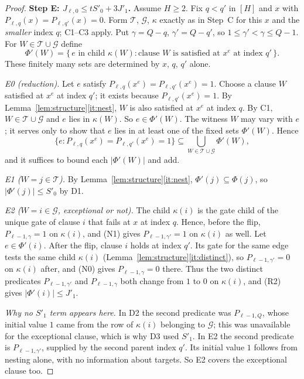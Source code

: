\documentclass[11pt]{article}
\theoremstyle{definition}
\theoremstyle{remark}
\begin{document}
\begin{proof}
\medskip\noindent\textbf{Step E: \(J_{\ell,0}\le tS'_0+3J'_1\).}
Assume \(H\ge2\). Fix \(q<q'\) in \([H]\) and \(x\) with
\(P_{\ell,q}(x)=P_{\ell,q'}(x)=0\). Form \(\mathcal T\), \(\mathcal G\),
\(\kappa\) exactly as in Step~C for this \(x\) and the \emph{smaller} index
\(q\); C1--C3 apply. Put \(\gamma=Q-q\), \(\gamma'=Q-q'\), so
\(1\le\gamma'<\gamma\le Q-1\). For \(W\in\mathcal T\cup\mathcal G\) define
\[
 \Phi'(W)=\{\,e\text{ in child }\kappa(W):
 \text{clause \(W\) is satisfied at \(x^e\) at index \(q'\)}\,\}.
\]
These finitely many sets are determined by \(x\), \(q\), \(q'\) alone.

\emph{E0 (reduction).} Let \(e\) satisfy
\(P_{\ell,q}(x^e)=P_{\ell,q'}(x^e)=1\). Choose a clause \(W\) satisfied at
\(x^e\) at index \(q'\); it exists because \(P_{\ell,q'}(x^e)=1\). By
Lemma~\ref{lem:structure}\ref{it:nest}, \(W\) is also
satisfied at \(x^e\) at index \(q\). By C1, \(W\in\mathcal T\cup\mathcal G\)
and \(e\) lies in \(\kappa(W)\). So \(e\in\Phi'(W)\). The witness \(W\) may
vary with \(e\); it serves only to show that \(e\) lies in at least one of
the fixed sets \(\Phi'(W)\). Hence
\[
 \{e:P_{\ell,q}(x^e)=P_{\ell,q'}(x^e)=1\}\subseteq
 \bigcup_{W\in\mathcal T\cup\mathcal G}\Phi'(W),
\]
and it suffices to bound each \(|\Phi'(W)|\) and add.

\emph{E1 (\(W=j\in\mathcal T\)).} By
Lemma~\ref{lem:structure}\ref{it:nest}, \(\Phi'(j)\subseteq\Phi(j)\), so
\(|\Phi'(j)|\le S'_0\) by D1.

\emph{E2 (\(W=i\in\mathcal G\), exceptional or not).} The child
\(\kappa(i)\) is the gate child of the unique gate of clause \(i\) that
fails at \(x\) at index \(q\). Hence, before the flip, \(P_{\ell-1,\gamma}=1\)
on \(\kappa(i)\), and (N1) gives \(P_{\ell-1,\gamma'}=1\) on \(\kappa(i)\)
as well. Let \(e\in\Phi'(i)\). After the flip, clause \(i\) holds at index
\(q'\). Its gate for the same edge tests the same child \(\kappa(i)\)
(Lemma~\ref{lem:structure}\ref{it:distinct}), so
\(P_{\ell-1,\gamma'}=0\) on \(\kappa(i)\) after, and (N0) gives
\(P_{\ell-1,\gamma}=0\) there. Thus the two distinct predicates
\(P_{\ell-1,\gamma'}\) and \(P_{\ell-1,\gamma}\) both change from \(1\) to
\(0\) on \(\kappa(i)\), and (R2) gives \(|\Phi'(i)|\le J'_1\).

\emph{Why no \(S'_1\) term appears here.} In D2 the second predicate was
\(P_{\ell-1,Q}\), whose initial value \(1\) came from the row of
\(\kappa(i)\) belonging to \(\mathcal G\); this was unavailable for the
exceptional clause, which is why D3 used \(S'_1\). In E2 the second
predicate is \(P_{\ell-1,\gamma'}\), supplied by the second parent index
\(q'\). Its initial value \(1\) follows from nesting alone, with no
information about targets. So E2 covers the exceptional clause too.


\end{proof}
\end{document}
